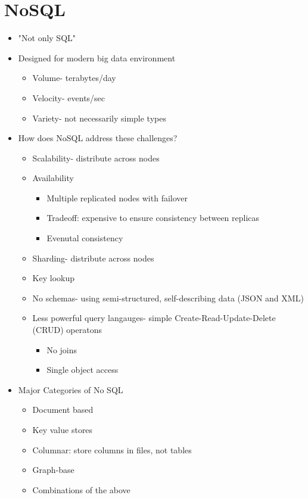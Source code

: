 \documentclass[12pt]{article}
\begin{document}
	\section*{NoSQL}
		\begin{itemize}
			\item
				"Not only SQL"
			\item
				Designed for modern big data environment
				\begin{itemize}
					\item
						Volume- terabytes/day
					\item
						Velocity- events/sec
					\item
						Variety- not necessarily simple types
				\end{itemize}
			\item
				How does NoSQL address these challenges?
				\begin{itemize}
					\item
						Scalability- distribute across nodes
					\item
						Availability
						\begin{itemize}
							\item
								Multiple replicated nodes with failover
							\item
								Tradeoff: expensive to ensure consistency between replicas
							\item
								Evenutal consistency
						\end{itemize}
					\item
						Sharding- distribute across nodes
					\item
						Key lookup
					\item
						No schemas- using semi-structured, self-describing data (JSON and XML)
					\item
						Less powerful query langauges- simple Create-Read-Update-Delete (CRUD) operatons
						\begin{itemize}
							\item
								No joins
							\item
								Single object access
						\end{itemize}
				\end{itemize}
			\item
				Major Categories of No SQL
				\begin{itemize}
					\item
						Document based
					\item
						Key value stores
					\item
						Columnar: store columns in files, not tables
					\item
						Graph-base
					\item
						Combinations of the above
				\end{itemize}
		\end{itemize}
\end{document}
